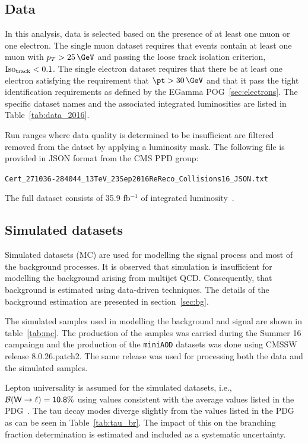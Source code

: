 \subsection{Data}
\label{sec:cms_data}

In this analysis, data is selected based on the presence of at least one
muon or one electron.  The single muon dataset requires that
events contain at least one muon with $p_{T} > 25\,\GeV$ and passing the
loose track isolation criterion, $\rm Iso_{track} < 0.1$.  The single
electron dataset requires that there be at least one electron satisfying
the requirement that $\pt > 30\,\GeV$ and that it pass the tight
identification requirements as defined by the EGamma
POG~\ref{sec:electrons}.  The specific dataset names and the associated
integrated luminosities are listed in Table~\ref{tab:data_2016}.



Run ranges where data quality is determined to be insufficient are
filtered removed from the datset by applying a luminosity mask.  The
following file is provided in JSON format from the CMS PPD group:

\texttt{Cert\_271036-284044\_13TeV\_23Sep2016ReReco\_Collisions16\_JSON.txt}

The full dataset consists of 35.9 fb$^{-1}$ of integrated
luminosity~\cite{CMS-PAS-LUM-17-001}.

\subsection{Simulated datasets}
\label{sec:simulation}

Simulated datasets (MC) are used for modelling the signal process and
most of the background processes.  It is observed that simulation is
insufficient for modelling the background arising from multijet QCD.
Consequently, that background is estimated using data-driven techniques.
The details of the background estimation are presented in
section~\ref{sec:bg}.

The simulated samples used in modelling the background and signal are
shown in table~\ref{tab:mc}.  The production of the samples was carried
during the Summer 16 campaingn and the production of the
\texttt{miniAOD} datasets was done using CMSSW release 8.0.26.patch2.
The same release was used for processing both the data and the simulated
samples.



Lepton universality is assumed for the simulated datasets, i.e., $\sf
\mathcal{B}(W\rightarrow\ell) = 10.8\%$ using values consistent with the
average values listed in the PDG~\cite{Patrignani:2016xqp}.  The tau
decay modes diverge slightly from the values listed in the PDG as can be
seen in Table~\ref{tab:tau_br}.  The impact of this on the branching
fraction determination is estimated and included as a systematic
uncertainty.

